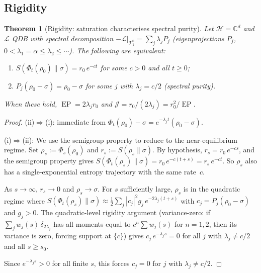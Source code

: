 \documentclass[11pt,a4paper]{article}
\newtheorem{theorem}{Theorem}[section]
\theoremstyle{definition}
\theoremstyle{remark}
\DeclareMathOperator{\EP}{EP}
\newcommand{\C}{\mathbb{C}}
\newcommand{\HH}{\mathcal{H}}
\newcommand{\TT}{\mathcal{T}}
\newcommand{\LL}{\mathcal{L}}
\begin{document}
\subsection{Rigidity}\label{ssec:rigidity}

\begin{theorem}[Rigidity: saturation characterises spectral
purity]\label{thm:rigidity}
Let $\HH = \C^d$ and $\LL$ QDB with spectral decomposition
$-\LL|_{\TT_1^0} = \sum_j \lambda_j P_j$ (eigenprojections $P_j$,
$0 < \lambda_1 = \alpha \le \lambda_2 \le \cdots$).  The following
are equivalent:
\begin{enumerate}[label=\textup{(\roman*)}]
  \item $S(\Phi_t(\rho_0)\|\sigma) = r_0\,e^{-ct}$ for
  some $c > 0$ and all $t \ge 0$;
  \item $P_j(\rho_0 - \sigma) = \rho_0 - \sigma$ for some $j$
  with $\lambda_j = c/2$ (spectral purity).
\end{enumerate}
When these hold, $\EP = 2\lambda_j r_0$ and
$\mathcal{J} = r_0/(2\lambda_j) = r_0^2/\EP$.
\end{theorem}

\begin{proof}
(ii)$\Rightarrow$(i): immediate from
$\Phi_t(\rho_0)-\sigma = e^{-\lambda_j t}(\rho_0-\sigma)$.

(i)$\Rightarrow$(ii): We use the semigroup property to reduce to
the near-equilibrium regime.
Set $\rho_s := \Phi_s(\rho_0)$ and $r_s := S(\rho_s\|\sigma)$.
By hypothesis, $r_s = r_0\,e^{-cs}$, and the semigroup property
gives $S(\Phi_t(\rho_s)\|\sigma) = r_0\,e^{-c(t+s)} = r_s\,e^{-ct}$.
So $\rho_s$ also has a single-exponential entropy trajectory with
the same rate~$c$.

As $s \to \infty$, $r_s \to 0$ and $\rho_s \to \sigma$.  For $s$
sufficiently large, $\rho_s$ is in the quadratic regime where
$S(\Phi_t(\rho_s)\|\sigma) \approx \frac{1}{2}\sum_j |c_j|^2 g_j
\,e^{-2\lambda_j(t+s)}$
with $c_j = P_j(\rho_0-\sigma)$ and $g_j > 0$.  The quadratic-level
rigidity argument (variance-zero: if
$\sum_j w_j(s)\,\delta_{2\lambda_j}$ has all moments equal to
$c^n\sum w_j(s)$ for $n = 1,2$, then its variance is zero, forcing
support at $\{c\}$) gives $c_j\,e^{-\lambda_j s} = 0$ for all $j$
with $\lambda_j \ne c/2$ and all $s \ge s_0$.

Since $e^{-\lambda_j s} > 0$ for all finite $s$, this forces
$c_j = 0$ for $j$ with $\lambda_j \ne c/2$.
\end{proof}
\end{document}
